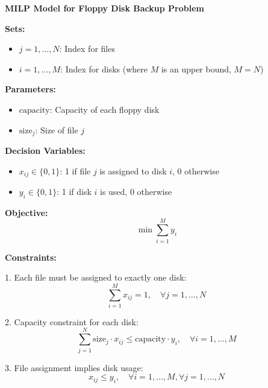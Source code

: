 \documentclass{article}
\begin{document}
\textbf{MILP Model for Floppy Disk Backup Problem}

\textbf{Sets:}
\begin{itemize}
    \item \( j = 1, \ldots, N \): Index for files
    \item \( i = 1, \ldots, M \): Index for disks (where \( M \) is an upper bound, \( M = N \))
\end{itemize}

\textbf{Parameters:}
\begin{itemize}
    \item \( \text{capacity} \): Capacity of each floppy disk
    \item \( \text{size}_j \): Size of file \( j \)
\end{itemize}

\textbf{Decision Variables:}
\begin{itemize}
    \item \( x_{ij} \in \{0, 1\} \): 1 if file \( j \) is assigned to disk \( i \), 0 otherwise
    \item \( y_i \in \{0, 1\} \): 1 if disk \( i \) is used, 0 otherwise
\end{itemize}

\textbf{Objective:}
\[
\min \sum_{i=1}^{M} y_i
\]

\textbf{Constraints:}

1. Each file must be assigned to exactly one disk:
\[
\sum_{i=1}^{M} x_{ij} = 1, \quad \forall j = 1, \ldots, N
\]

2. Capacity constraint for each disk:
\[
\sum_{j=1}^{N} \text{size}_j \cdot x_{ij} \leq \text{capacity} \cdot y_i, \quad \forall i = 1, \ldots, M
\]

3. File assignment implies disk usage:
\[
x_{ij} \leq y_i, \quad \forall i = 1, \ldots, M, \forall j = 1, \ldots, N
\]
\end{document}
